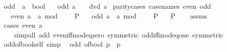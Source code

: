 \begin{isabellebody}
\isanewline
{}\isamarkupfalse%
\ odd\ {\isacharcolon}{\kern0pt}{\isacharcolon}{\kern0pt}\ {\isachardoublequoteopen}{\isacharprime}{\kern0pt}a\ {\isasymRightarrow}\ bool{\isachardoublequoteclose}\isanewline
\ \ \ {\isachardoublequoteopen}odd\ a\ {\isasymequiv}\ {\isasymnot}\ {}\ dvd\ a{\isachardoublequoteclose}\isanewline
\isanewline
{}\isamarkupfalse%
\ parity{\isacharunderscore}{\kern0pt}cases\ {\isacharbrackleft}{\kern0pt}case{\isacharunderscore}{\kern0pt}names\ even\ odd{\isacharbrackright}{\kern0pt}{\isacharcolon}{\kern0pt}\isanewline
\ \ \ {\isachardoublequoteopen}even\ a\ {\isasymLongrightarrow}\ a\ mod\ {}\ {\isacharequal}{\kern0pt}\ {}\ {\isasymLongrightarrow}\ P{\isachardoublequoteclose}\isanewline
\ \ \ {\isachardoublequoteopen}odd\ a\ {\isasymLongrightarrow}\ a\ mod\ {}\ {\isacharequal}{\kern0pt}\ {}\ {\isasymLongrightarrow}\ P{\isachardoublequoteclose}\isanewline
\ \ \ P\isanewline
%
\isadelimproof
\ \ %
\endisadelimproof
%
\isatagproof
{}\isamarkupfalse%
\ assms\ \isamarkupfalse%
\ {\isacharparenleft}{\kern0pt}cases\ {\isachardoublequoteopen}even\ a{\isachardoublequoteclose}{\isacharparenright}{\kern0pt}\isanewline
\ \ \ \ {\isacharparenleft}{\kern0pt}simp{\isacharunderscore}{\kern0pt}all\ add{\isacharcolon}{\kern0pt}\ even{\isacharunderscore}{\kern0pt}iff{\isacharunderscore}{\kern0pt}mod{\isacharunderscore}{\kern0pt}{}{\isacharunderscore}{\kern0pt}eq{\isacharunderscore}{\kern0pt}zero\ {\isacharbrackleft}{\kern0pt}symmetric{\isacharbrackright}{\kern0pt}\ odd{\isacharunderscore}{\kern0pt}iff{\isacharunderscore}{\kern0pt}mod{\isacharunderscore}{\kern0pt}{}{\isacharunderscore}{\kern0pt}eq{\isacharunderscore}{\kern0pt}one\ {\isacharbrackleft}{\kern0pt}symmetric{\isacharbrackright}{\kern0pt}{\isacharparenright}{\kern0pt}%
\endisatagproof
{\isafoldproof}%
%
\isadelimproof
\isanewline
%
\endisadelimproof
\isanewline
{}\isamarkupfalse%
\ odd{\isacharunderscore}{\kern0pt}of{\isacharunderscore}{\kern0pt}bool{\isacharunderscore}{\kern0pt}self\ {\isacharbrackleft}{\kern0pt}simp{\isacharbrackright}{\kern0pt}{\isacharcolon}{\kern0pt}\isanewline
\ \ {\isacartoucheopen}odd\ {\isacharparenleft}{\kern0pt}of{\isacharunderscore}{\kern0pt}bool\ p{\isacharparenright}{\kern0pt}\ {\isasymlongleftrightarrow}\ p{\isacartoucheclose}\isanewline
%
\isadelimproof
\ \ %
\endisadelimproof
%
\isatagproof
{}\isamarkupfalse%

\end{isabellebody}
